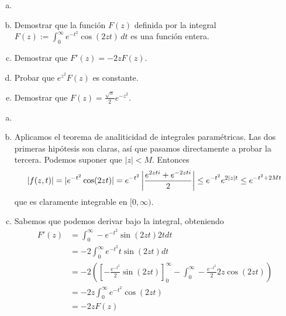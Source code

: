 \documentclass[twoside]{article}
\begin{document}
\newpage


\begin{ejercicio}{5}
\begin{enumerate}[a)]
\item[]
\item Demostrar que la función $F(z)$ definida por la integral
$\displaystyle{F(z):= \int_0^\infty e^{-t^2}\cos(2z t)\,dt}$
es una función entera.
\item Demostrar que $F'(z)=-2z F(z)$. 
\item Probar que $e^{z^2}F(z)$ es constante. 
\item Demostrar que  $F(z)=\frac{\sqrt{\pi}}{2}e^{-z^2}$. 
\end{enumerate} 
\end{ejercicio}
\begin{solucion}
\begin{enumerate}[a)]
\item[]
\item Aplicamos el teorema de analiticidad de integrales paramétricas. Las dos primeras hipótesis son claras, así que pasamos directamente a probar la tercera. Podemos suponer que $|z|<M$. Entonces
$$
|f(z,t)| = |e^{-t^2}\cos(2zt)| = e^{-t^2}\left\lvert\frac{e^{2zti}+e^{-2zti}}{2}\right\rvert\leq e^{-t^2}e^{2|z|t} \leq e^{-t^2 +2Mt}
$$
que es claramente integrable en $[0,\infty)$.
\item Sabemos que podemos derivar bajo la integral, obteniendo
\begin{align*}
F'(z)&=\int_0^\infty -e^{-t^2} \sin(2zt) 2t dt \\
&=-2 \int_0^\infty e^{-t^2}t \sin(2zt) dt\\
&=-2 \left( \left[-\frac{e^{-t^2}}{2}\sin(2zt)\right]^\infty_0 - \int_0^\infty  -\frac{e^{-t^2}}{2} 2z \cos(2zt) \right)\\
&= -2 z\int_0^\infty e^{-t^2}\cos(2zt)\\
&= -2zF(z)
\end{align*}

\end{enumerate}
\end{solucion}
\newpage
\end{document}
